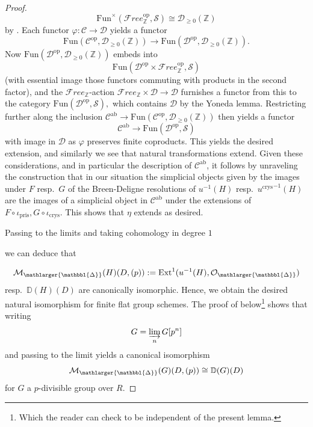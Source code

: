 \documentclass{amsart}
\newcommand{\prism}{{\mathlarger{\mathbbl{\Delta}}}}
\theoremstyle{plain}
\theoremstyle{definition}
\newcommand{\crys}{\mathrm{crys}}
\newcommand{\pris}{\mathrm{pris}}
\newcommand{\Z}{\mathbb{Z}}
\begin{document}
\begin{proof}
{      \[
        \mathrm{Fun}^{\times}(\mathcal{F}ree_{\Z}^{\mathrm{op}},\mathcal{S})\cong \mathcal{D}_{\geq 0}(\Z)
      \]
      by \cite[Example 1.2.9]{lurie2017elliptic}. Each functor $\varphi\colon \mathcal{C}\to \mathcal{D}$ yields a functor
      \[
        \mathrm{Fun}(\mathcal{C}^{\mathrm{op}},\mathcal{D}_{\geq 0}(\Z))\to \mathrm{Fun}(\mathcal{D}^{\mathrm{op}},\mathcal{D}_{\geq 0}(\Z)).
      \]
      Now $\mathrm{Fun}(\mathcal{D}^{\mathrm{op}},\mathcal{D}_{\geq 0}(\Z))$ embeds into
      \[
        \mathrm{Fun}(\mathcal{D}^{\mathrm{op}}\times \mathcal{F}ree_\Z^{\mathrm{op}},\mathcal{S})
        \]
        (with essential image those functors commuting with products in the second factor), and the $\mathcal{F}ree_\Z$-action $\mathcal{F}ree_\Z\times \mathcal{D}\to \mathcal{D}$ furnishes a functor from this to the category $\mathrm{Fun}(\mathcal{D}^{\mathrm{op}},\mathcal{S}),$
        which contains $\mathcal{D}$ by the Yoneda lemma. Restricting further along the inclusion $\mathcal{C}^{\mathrm{ab}}\to \mathrm{Fun}(\mathcal{C}^{\mathrm{op}},\mathcal{D}_{\geq 0}(\Z))$ then yields a functor
        \[
          \mathcal{C}^{\mathrm{ab}}\to \mathrm{Fun}(\mathcal{D}^{\mathrm{op}},\mathcal{S})
        \]
        with image in $\mathcal{D}$ as $\varphi$ preserves finite coproducts. This yields the desired extension, and similarly we see that natural transformations extend.
        Given these considerations, and in particular the description of $\mathcal{C}^{\mathrm{ab}}$, it follows by unraveling the construction that in our situation the simplicial objects given by the images under $F$ resp.\ $G$ of the Breen-Deligne resolutions of $u^{-1}(H)$ resp.\ ${u^{\crys}}^{-1}(H)$ are the images of a simplicial object in $\mathcal{C}^{\mathrm{ab}}$ under the extensions of $F\circ \iota_\pris, G\circ \iota_\crys$. This shows that $\eta$ extends as desired.
       
   Passing to the limits and taking cohomology in degree $1$} we can deduce that

  $$
  \mathcal{M}_\prism(H)(D,(p)):=\mathrm{Ext}^1(u^{-1}(H),\mathcal{O}_\prism)
  $$ resp.\ $\mathbb{D}(H)(D)$ are canonically isomorphic. Hence, we obtain the desired natural isomorphism for finite flat group schemes. The proof of  below\footnote{Which the reader can check to be independent of the present lemma.} shows that writing $$G=\varinjlim\limits_{n}G[p^n]$$ and passing to the limit yields a canonical isomorphism
  $$
\mathcal{M}_\prism(G)(D,(p))\cong \mathbb{D}(G)(D)
$$
for $G$ a $p$-divisible group over $R$.
\end{proof}
\end{document}
